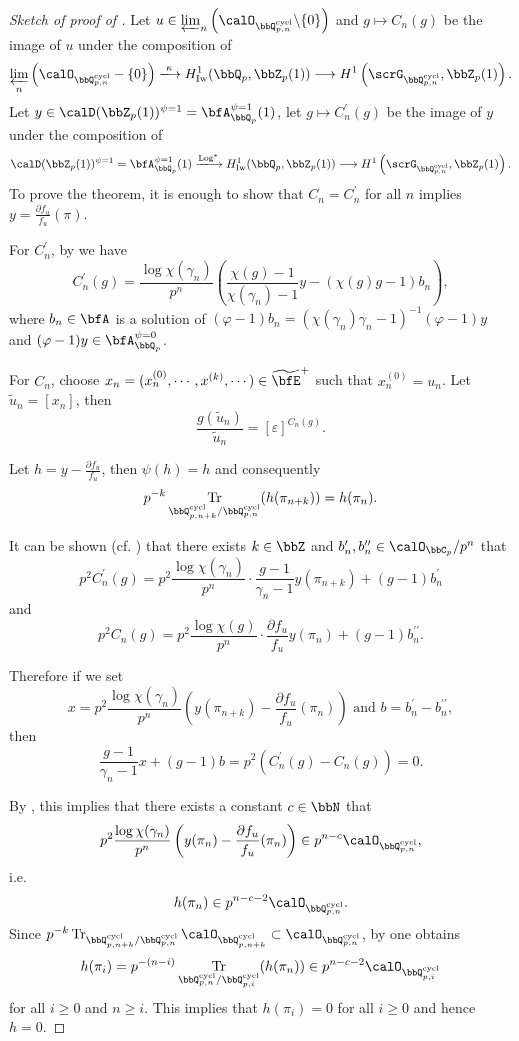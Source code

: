 \documentclass[a4paper,oneside]{amsart}
\let\opn\operatorname
\DeclareMathOperator{\cycl}{cycl}
\DeclareMathOperator{\Tr}{Tr}
\newcommand{\lto}{\longrightarrow}
\let\xlto\xlongrightarrow
\newcommand{\Iw}{\opn{Iw}}
\numberwithin{equation}{section}
\begin{document}
\begin{proof}[Sketch of proof of ]
    Let $u\in\varprojlim_n \left(\calO_{\bbQ_{p,n}^{\cycl}}\backslash\{0\}\right)$  and $g\longmapsto C_n(g)$ be the image of $u$ under the composition of
    $$\varprojlim_n\left(\calO_{\bbQ_{p,n}^{\cycl}}-\{0\}\right)\xlto{\kappa}H_{\Iw}^1(\bbQ_p,\bbZ_p(1))\lto H^1\left(\scrG_{\bbQ_{p,n}^{\cycl}},\bbZ_p(1)\right).$$
    Let $y\in\calD(\bbZ_p(1))^{\psi=1}=\bfA_{\bbQ_p}^{\psi=1}(1)$, let $g\longmapsto C_n^\prime(g)$ be the image of $y$ under the composition of
    $$\calD(\bbZ_p(1))^{\psi=1}=\bfA_{\bbQ_p}^{\psi=1}(1)\xlto{\opn{Log}^*}H^1_{\Iw}(\bbQ_p,\bbZ_p(1))\lto H^1\left(\scrG_{\bbQ_{p,n}^{\cycl}},\bbZ_p(1)\right).$$
    To prove the theorem, it is enough to show that $C_n=C_n^\prime$  for all $n$ implies $y=\frac{\partial f_u}{f_u}(\pi)$.

    For $C_n^\prime$, by  we have
    $$C_n^\prime(g)=\frac{\log \chi(\gamma_n)}{p^n}\left(
        \frac{\chi(g)-1}{\chi(\gamma_n)-1}y-(\chi(g)g-1)b_n\right),$$
    where $b_n\in\bfA$ is a solution of $(\varphi-1)b_n=(\chi(\gamma_n)\gamma_n-1)^{-1}(\varphi-1)y$ and $(\varphi-1)y\in\bfA_{\bbQ_p}^{\psi=0}$.

    For $C_n$, choose $x_n=(x_n^{(0)},\cdots,x^{(k)},\cdots)\in\widetilde{\bfE}^+$ such that $x_n^{(0)}=u_n$. Let $\tilde{u}_n=[x_n]$, then
    $$\frac{g(\tilde{u}_n)}{\tilde{u}_n}=[\varepsilon]^{C_n(g)}.$$

    Let $h=y-\frac{\partial f_u}{f_u}$, then $\psi(h)=h$ and consequently
    \begin{equation}\label{eq:24892}
        p^{-k}\Tr_{\bbQ_{p,n+k}^{\cycl}/\bbQ_{p,n}^{\cycl}}(h(\pi_{n+k}))=h(\pi_n).
    \end{equation}

    It can be shown (cf. \cite[Proposition 7.5.2]{colmez_fontaines_nodate}) that there exists $k\in\bbZ$ and $b_n^\prime,b_n^{\prime\prime}\in\calO_{\bbC_p}/p^n$ that
    $$p^2C_n^\prime(g)=p^2\frac{\log\chi(\gamma_n)}{p^n}\cdot \frac{g-1}{\gamma_n-1}y(\pi_{n+k})+(g-1)b_n^\prime$$
    and
    $$p^2C_n(g)=p^2\frac{\log\chi(g)}{p^n}\cdot \frac{\partial f_u}{f_u}y(\pi_n)+(g-1)b_n^{\prime\prime}.$$

    Therefore if we set
    $$x=p^2\frac{\log\chi(\gamma_n)}{p^n}\left(y(\pi_{n+k})-\frac{\partial f_u}{f_u}(\pi_n)\right) \text{ and }b=b_n^\prime-b_n^{\prime\prime},$$
    then
    $$\frac{g-1}{\gamma_n-1}x+(g-1)b=p^2(C_n^\prime(g)-C_n(g))=0.$$

    By \cite[Proposition 7.5.2]{colmez_fontaines_nodate}, this implies that there exists a constant $c\in\bbN$ that
    $$p^2\frac{\log\chi(\gamma_n)}{p^n}\left(y(\pi_{n})-\frac{\partial f_u}{f_u}(\pi_n)\right)\in p^{n-c}\calO_{\bbQ_{p,n}^{\cycl}},$$
    i.e.
    $$h(\pi_n)\in p^{n-c-2}\calO_{\bbQ_{p,n}^{\cycl}}.$$
    Since $p^{-k}\Tr_{\bbQ_{p,n+k}^{\cycl}/\bbQ_{p,n}^{\cycl}}\calO_{\bbQ_{p,n+k}^{\cycl}}\subset \calO_{\bbQ_{p,n}^{\cycl}}$, by  one obtains
    $$h(\pi_i)=p^{-(n-i)}\Tr_{\bbQ_{p,n}^{\cycl}/\bbQ_{p,i}^{\cycl}}(h(\pi_n))\in p^{n-c-2}\calO_{\bbQ_{p,i}^{\cycl}}$$
    for all $i\geq 0$ and $n\geq i$. This implies that $h(\pi_i)=0$ for all $i\geq 0$ and hence $h=0$.
\end{proof}
\printbibliography
\end{document}
